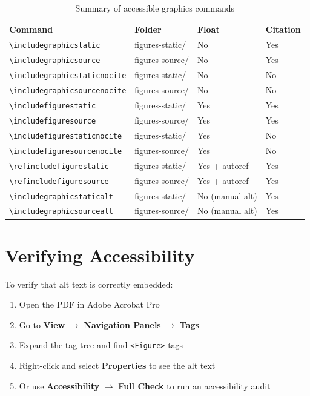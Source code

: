 \documentclass[12pt,letterpaper]{article}
\begin{document}
\begin{table}[ht]
\centering
\begin{tabular}{llll}
\hline
\textbf{Command} & \textbf{Folder} & \textbf{Float} & \textbf{Citation} \\
\hline
\verb|\includegraphicstatic| & figures-static/ & No & Yes \\
\verb|\includegraphicsource| & figures-source/ & No & Yes \\
\verb|\includegraphicstaticnocite| & figures-static/ & No & No \\
\verb|\includegraphicsourcenocite| & figures-source/ & No & No \\
\verb|\includefigurestatic| & figures-static/ & Yes & Yes \\
\verb|\includefiguresource| & figures-source/ & Yes & Yes \\
\verb|\includefigurestaticnocite| & figures-static/ & Yes & No \\
\verb|\includefiguresourcenocite| & figures-source/ & Yes & No \\
\verb|\refincludefigurestatic| & figures-static/ & Yes + autoref & Yes \\
\verb|\refincludefiguresource| & figures-source/ & Yes + autoref & Yes \\
\verb|\includegraphicstaticalt| & figures-static/ & No (manual alt) & Yes \\
\verb|\includegraphicsourcealt| & figures-source/ & No (manual alt) & Yes \\
\hline
\end{tabular}
\caption{Summary of accessible graphics commands}
\end{table}

\section{Verifying Accessibility}

To verify that alt text is correctly embedded:

\begin{enumerate}
  \item Open the PDF in Adobe Acrobat Pro
  \item Go to \textbf{View} $\rightarrow$ \textbf{Navigation Panels} $\rightarrow$ \textbf{Tags}
  \item Expand the tag tree and find \texttt{<Figure>} tags
  \item Right-click and select \textbf{Properties} to see the alt text
  \item Or use \textbf{Accessibility} $\rightarrow$ \textbf{Full Check} to run an accessibility audit
\end{enumerate}
\end{document}
